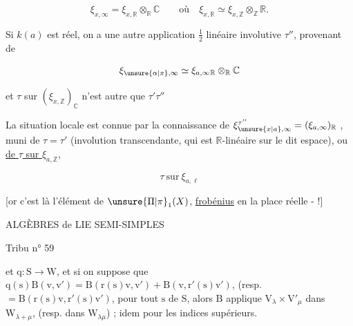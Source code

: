 \[
\xi_{x,\infty}=\xi_{x,\mathbb{R}}\otimes_{\mathbb{R}}\mathbb{C}
\qquad\text{où}\quad \xi_{x,\mathbb{R}}\simeq\xi_{x,\mathbb{Z}}\otimes_{\mathbb{Z}}\mathbb{R}.
\]

Si $k(a)$ est réel, on a une autre application $\tfrac12$ linéaire involutive $\tau''$, provenant de

\[
\xi_{\unsure{\alpha|x},\infty}\simeq\xi_{a,\infty}{}_{\mathbb{R}}\otimes_{\mathbb{R}}\mathbb{C}
\]

et $\tau$ sur $(\xi_{x,\mathbb{Z}})_{\mathbb{C}}$ n’est autre que $\tau'\tau''$



La situation locale  est connue par la connaissance de $\xi_{\unsure{x|a},\infty}^{\tau''}=(\xi_{a,\infty})_{\mathbb{R}}$ , muni de $\tau=\tau'$ (involution transcendante, qui est $\mathbb{R}$-linéaire sur le dit espace), ou  \uline{ de $\tau$ sur $\xi_{a,\mathbb{Z}}$}, 

\[
\boxed{\tau\ \text{sur}\ \xi_{a,\ell}}
\]

[or c’est là  l’élément de $\unsure{\Pi|\pi}_1(X)$, \uline{frobénius} en la place  réelle - !]


ALGÈBRES de LIE SEMI-SIMPLES 

Tribu n° 59

et $\mathrm{q}:\mathrm{S}\longrightarrow\mathrm{W}$, et si on suppose que $\mathrm{q}(\mathrm{s})\mathrm{B}(\mathrm{v},\mathrm{v}')=\mathrm{B}(\mathrm{r}(\mathrm{s})\mathrm{v},\mathrm{v}')+\mathrm{B}(\mathrm{v},\mathrm{r}'(\mathrm{s})\mathrm{v}')$, (resp. $=\mathrm{B}(\mathrm{r}(\mathrm{s})\mathrm{v},\mathrm{r}'(\mathrm{s})\mathrm{v}')$, pour tout $\mathrm{s}$ de $\mathrm{S}$, alors $\mathrm{B}$ applique $\mathrm{V}_{\lambda}\times\mathrm{V}'_{\mu}$ dans $\mathrm{W}_{\lambda+\mu}$, (resp. dans $\mathrm{W}_{\lambda\mu}$) ; idem pour les indices supérieurs.

